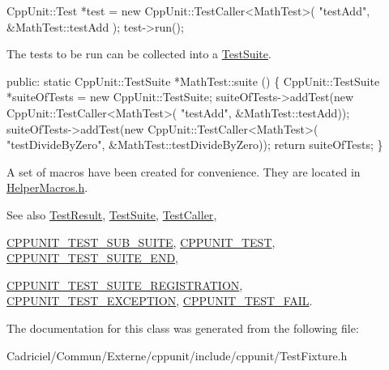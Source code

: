 \begin{DoxyCode}
CppUnit::Test *test = \textcolor{keyword}{new} CppUnit::TestCaller<MathTest>( \textcolor{stringliteral}{"testAdd"}, 
                                                         &MathTest::testAdd );
test->run();
\end{DoxyCode}


The tests to be run can be collected into a \hyperlink{class_test_suite}{Test\+Suite}.


\begin{DoxyCode}
\textcolor{keyword}{public}: 
  \textcolor{keyword}{static} CppUnit::TestSuite *MathTest::suite () \{
     CppUnit::TestSuite *suiteOfTests = \textcolor{keyword}{new} CppUnit::TestSuite;
     suiteOfTests->addTest(\textcolor{keyword}{new} CppUnit::TestCaller<MathTest>(
                             \textcolor{stringliteral}{"testAdd"}, &MathTest::testAdd));
     suiteOfTests->addTest(\textcolor{keyword}{new} CppUnit::TestCaller<MathTest>(
                             \textcolor{stringliteral}{"testDivideByZero"}, &MathTest::testDivideByZero));
     \textcolor{keywordflow}{return} suiteOfTests;
 \}
\end{DoxyCode}


A set of macros have been created for convenience. They are located in \hyperlink{_helper_macros_8h}{Helper\+Macros.\+h}.

\begin{DoxySeeAlso}{See also}
\hyperlink{class_test_result}{Test\+Result}, \hyperlink{class_test_suite}{Test\+Suite}, \hyperlink{class_test_caller}{Test\+Caller}, 

\hyperlink{group___writing_test_fixture_gae19f30ade82172cf6c3ff297367a10c2}{C\+P\+P\+U\+N\+I\+T\+\_\+\+T\+E\+S\+T\+\_\+\+S\+U\+B\+\_\+\+S\+U\+I\+TE}, \hyperlink{group___writing_test_fixture_ga6ba5fe7b8f52e401268b984008838754}{C\+P\+P\+U\+N\+I\+T\+\_\+\+T\+E\+ST}, \hyperlink{group___writing_test_fixture_ga3b353d6e84f681ae85cced96dce0a4ae}{C\+P\+P\+U\+N\+I\+T\+\_\+\+T\+E\+S\+T\+\_\+\+S\+U\+I\+T\+E\+\_\+\+E\+ND}, 

\hyperlink{_helper_macros_8h_a70f00cc9f589d24019ee9efee4de2d74}{C\+P\+P\+U\+N\+I\+T\+\_\+\+T\+E\+S\+T\+\_\+\+S\+U\+I\+T\+E\+\_\+\+R\+E\+G\+I\+S\+T\+R\+A\+T\+I\+ON}, \hyperlink{group___writing_test_fixture_ga0d51339f412270aee9a2d6c015d80ef2}{C\+P\+P\+U\+N\+I\+T\+\_\+\+T\+E\+S\+T\+\_\+\+E\+X\+C\+E\+P\+T\+I\+ON}, \hyperlink{group___writing_test_fixture_ga5bdaf0444216a8f93ead13d5ae964d7e}{C\+P\+P\+U\+N\+I\+T\+\_\+\+T\+E\+S\+T\+\_\+\+F\+A\+IL}. 
\end{DoxySeeAlso}


The documentation for this class was generated from the following file\+:\begin{DoxyCompactItemize}
\item 
Cadriciel/\+Commun/\+Externe/cppunit/include/cppunit/Test\+Fixture.\+h\end{DoxyCompactItemize}
